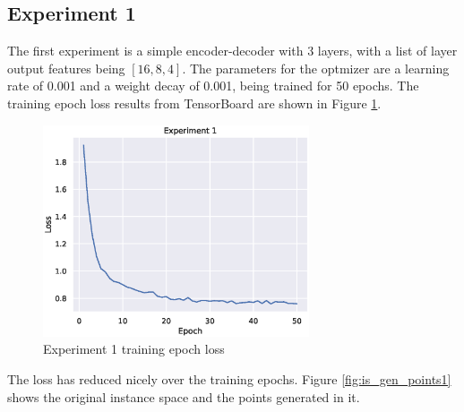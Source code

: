 \subsection{Experiment 1}

The first experiment is a simple encoder-decoder with 3 layers, with a list of layer output features being $[16, 8, 4]$. The parameters for the optmizer are a learning rate of 0.001 and a weight decay of 0.001, being trained for 50 epochs. The training epoch loss results from TensorBoard are shown in Figure \ref{fig:exp1}.

\begin{figure}[H]
    \centering
    \includegraphics[width=0.7\textwidth]{Cap5/loss_exp1}
    \caption{Experiment 1 training epoch loss}
    \label{fig:exp1}
\end{figure}

The loss has reduced nicely over the training epochs. Figure \ref{fig:is_gen_points1} shows the original instance space and the points generated in it.

